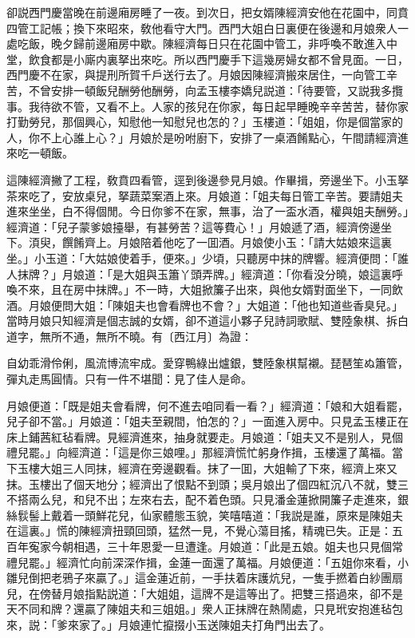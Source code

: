 卻説西門慶當晚在前邊廂房睡了一夜。到次日，把女婿陳經濟安他在花園中，同賁四管工記帳；換下來昭來，敎他看守大門。西門大姐白日裏便在後邊和月娘衆人一處吃飯，晚夕歸前邊廂房中歇。陳經濟每日只在花園中管工，非呼喚不敢進入中堂，飲食都是小廝内裏拏出來吃。所以西門慶手下這幾房婦女都不曾見面。一日，西門慶不在家，與提刑所賀千戶送行去了。月娘因陳經濟搬來居住，一向管工辛苦，不曾安排一頓飯兒酬勞他酬勞，向孟玉樓李嬌兒説道：「待要管，又説我多攬事。我待欲不管，又看不上。人家的孩兒在你家，每日起早睡晚辛辛苦苦，替你家打勤勞兒，那個興心，知慰他一知慰兒也怎的？」玉樓道：「姐姐，你是個當家的人，你不上心誰上心？」月娘於是吩咐廚下，安排了一桌酒餚點心，午間請經濟進來吃一頓飯。

這陳經濟撇了工程，敎賁四看管，逕到後邊參見月娘。作畢揖，旁邊坐下。小玉拏茶來吃了，安放桌兒，拏蔬菜案酒上來。月娘道：「姐夫每日管工辛苦。要請姐夫進來坐坐，白不得個閒。今日你爹不在家，無事，治了一盃水酒，權與姐夫酬勞。」經濟道：「兒子蒙爹娘擡舉，有甚勞苦？這等費心！」月娘遞了酒，經濟傍邊坐下。湏臾，饌餚齊上。月娘陪着他吃了一囬酒。月娘使小玉：「請大姑娘來這裏坐。」小玉道：「大姑娘使着手，便來。」少頃，只聽房中抹的牌響。經濟便問：「誰人抹牌？」月娘道：「是大姐與玉簫丫頭弄牌。」經濟道：「你看没分曉，娘這裏呼喚不來，且在房中抹牌。」不一時，大姐掀簾子出來，與他女婿對面坐下，一同飲酒。月娘便問大姐：「陳姐夫也會看牌也不會？」大姐道：「他也知道些香臭兒。」當時月娘只知經濟是個志誠的女婿，卻不道這小夥子兒詩詞歌賦、雙陸象棋、拆白道字，無所不通，無所不曉。有〔西江月〕為證：

\begin{myquote}
自幼乖滑伶俐，風流博流牢成。愛穿鴨綠出爐銀，雙陸象棋幫襯。琵琶笙ぬ簫管，彈丸走馬圓情。只有一件不堪聞：見了佳人是命。
\end{myquote}

月娘便道：「既是姐夫會看牌，何不進去咱同看一看？」經濟道：「娘和大姐看罷，兒子卻不當。」月娘道：「姐夫至親間，怕怎的？」一面進入房中。只見孟玉樓正在床上鋪茜紅毡看牌。見經濟進來，抽身就要走。月娘道：「姐夫又不是别人，見個禮兒罷。」向經濟道：「這是你三娘哩。」那經濟慌忙躬身作揖，玉樓還了萬福。當下玉樓大姐三人同抹，經濟在旁邊觀看。抹了一囬，大姐輸了下來，經濟上來又抹。玉樓出了個天地分；經濟出了恨點不到頭；吳月娘出了個四紅沉八不就，雙三不搭兩么兒，和兒不出；左來右去，配不着色頭。只見潘金蓮掀開簾子走進來，銀絲䯼髻上戴着一頭鮮花兒，仙家體態玉貌，笑嘻嘻道：「我説是誰，原來是陳姐夫在這裏。」慌的陳經濟扭頸回頭，猛然一見，不覺心蕩目搖，精魂已失。正是：五百年寃家今朝相遇，三十年恩愛一旦遭逢。月娘道：「此是五娘。姐夫也只見個常禮兒罷。」經濟忙向前深深作揖，金蓮一面還了萬福。月娘便道：「五姐你來看，小雛兒倒把老鴉子來贏了。」這金蓮近前，一手扶着床護炕兒，一隻手撚着白紗團扇兒，在傍替月娘指點説道：「大姐姐，這牌不是這等出了。把雙三搭過來，卻不是天不同和牌？還贏了陳姐夫和三姐姐。」衆人正抹牌在熱鬧處，只見玳安抱進毡包來，説：「爹來家了。」月娘連忙攛掇小玉送陳姐夫打角門出去了。

